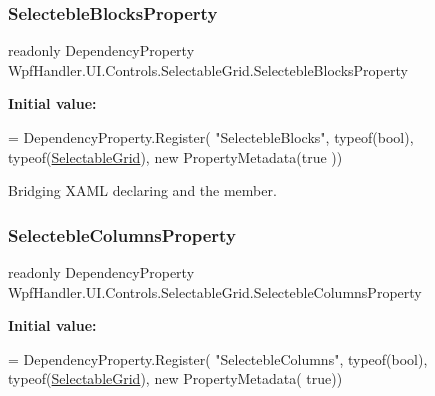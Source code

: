 \subsubsection{\texorpdfstring{Selecteble\+Blocks\+Property}{SelectebleBlocksProperty}}
{\footnotesize\ttfamily readonly Dependency\+Property Wpf\+Handler.\+U\+I.\+Controls.\+Selectable\+Grid.\+Selecteble\+Blocks\+Property\hspace{0.3cm}{\ttfamily [static]}}

{\bfseries Initial value\+:}
\begin{DoxyCode}
= DependencyProperty.Register(
          \textcolor{stringliteral}{"SelectebleBlocks"}, typeof(\textcolor{keywordtype}{bool}), typeof(\mbox{\hyperlink{class_wpf_handler_1_1_u_i_1_1_controls_1_1_selectable_grid_a3968411e99848235dfb6bdb7ec0f8fc5}{SelectableGrid}}), \textcolor{keyword}{new} PropertyMetadata(\textcolor{keyword}{true}
      ))
\end{DoxyCode}


Bridging X\+A\+ML declaring and the member. 

\mbox{\label{class_wpf_handler_1_1_u_i_1_1_controls_1_1_selectable_grid_aed373719e62f55815d7042d62fdf8a88}} 
\subsubsection{\texorpdfstring{Selecteble\+Columns\+Property}{SelectebleColumnsProperty}}
{\footnotesize\ttfamily readonly Dependency\+Property Wpf\+Handler.\+U\+I.\+Controls.\+Selectable\+Grid.\+Selecteble\+Columns\+Property\hspace{0.3cm}{\ttfamily [static]}}

{\bfseries Initial value\+:}
\begin{DoxyCode}
= DependencyProperty.Register(
          \textcolor{stringliteral}{"SelectebleColumns"}, typeof(\textcolor{keywordtype}{bool}), typeof(\mbox{\hyperlink{class_wpf_handler_1_1_u_i_1_1_controls_1_1_selectable_grid_a3968411e99848235dfb6bdb7ec0f8fc5}{SelectableGrid}}), \textcolor{keyword}{new} PropertyMetadata(\textcolor{keyword}{
      true}))
\end{DoxyCode}


